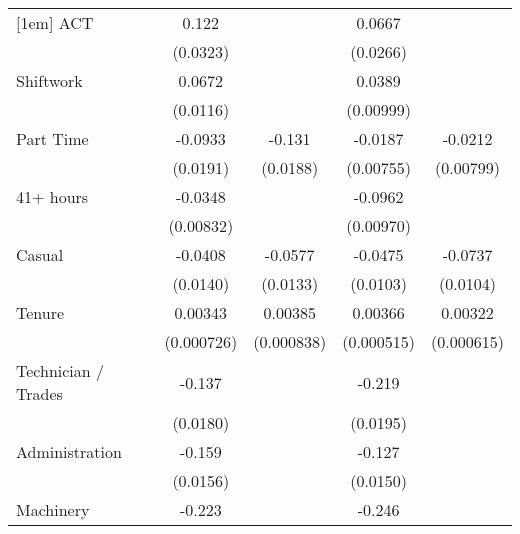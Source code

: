 {\begin{tabular}{l*{4}{c}}
[1em]
ACT                 &       0.122\sym{***}&                     &      0.0667\sym{*}  &                     \\
                    &    (0.0323)         &                     &    (0.0266)         &                     \\
[1em]
Shiftwork           &      0.0672\sym{***}&                     &      0.0389\sym{***}&                     \\
                    &    (0.0116)         &                     &   (0.00999)         &                     \\
[1em]
Part Time           &     -0.0933\sym{***}&      -0.131\sym{***}&     -0.0187\sym{*}  &     -0.0212\sym{**} \\
                    &    (0.0191)         &    (0.0188)         &   (0.00755)         &   (0.00799)         \\
[1em]
41+ hours           &     -0.0348\sym{***}&                     &     -0.0962\sym{***}&                     \\
                    &   (0.00832)         &                     &   (0.00970)         &                     \\
[1em]
Casual              &     -0.0408\sym{**} &     -0.0577\sym{***}&     -0.0475\sym{***}&     -0.0737\sym{***}\\
                    &    (0.0140)         &    (0.0133)         &    (0.0103)         &    (0.0104)         \\
[1em]
Tenure              &     0.00343\sym{***}&     0.00385\sym{***}&     0.00366\sym{***}&     0.00322\sym{***}\\
                    &  (0.000726)         &  (0.000838)         &  (0.000515)         &  (0.000615)         \\
[1em]
Technician / Trades &      -0.137\sym{***}&                     &      -0.219\sym{***}&                     \\
                    &    (0.0180)         &                     &    (0.0195)         &                     \\
[1em]
Administration      &      -0.159\sym{***}&                     &      -0.127\sym{***}&                     \\
                    &    (0.0156)         &                     &    (0.0150)         &                     \\
[1em]
Machinery           &      -0.223\sym{***}&                     &      -0.246\sym{***}&                     \\

\end{tabular}}
